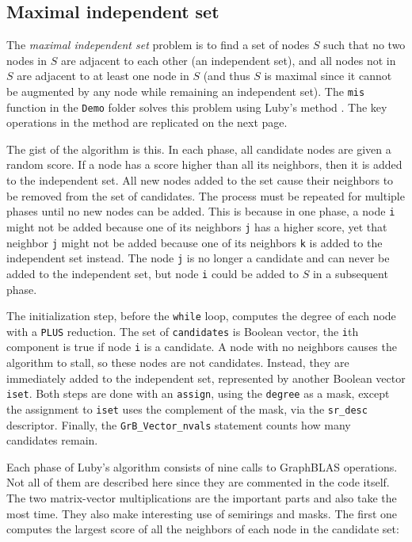 \documentclass[12pt]{article}
\begin{document}
\newpage
\subsection{Maximal independent set}
\label{mis}

The {\em maximal independent set} problem is to find a set of nodes $S$ such
that no two nodes in $S$ are adjacent to each other (an independent set), and
all nodes not in $S$ are adjacent to at least one node in $S$ (and thus $S$ is
maximal since it cannot be augmented by any node while remaining an independent
set).  The \verb'mis' function in the \verb'Demo' folder solves this problem
using Luby's method \cite{Luby86}.  The key operations in the method are
replicated on the next page.

The gist of the algorithm is this.  In each phase, all candidate nodes are
given a random score.  If a node has a score higher than all its neighbors,
then it is added to the independent set.  All new nodes added to the set cause
their neighbors to be removed from the set of candidates.  The process must be
repeated for multiple phases until no new nodes can be added.  This is because
in one phase, a node \verb'i' might not be added because one of its neighbors
\verb'j' has a higher score, yet that neighbor \verb'j' might not be added
because one of its neighbors \verb'k' is added to the independent set instead.
The node \verb'j' is no longer a candidate and can never be added to the
independent set, but node \verb'i' could be added to $S$ in a subsequent phase.

The initialization step, before the \verb'while' loop, computes the degree of
each node with a \verb'PLUS' reduction.  The set of \verb'candidates' is
Boolean vector, the \verb'i'th component is true if node \verb'i' is a
candidate.  A node with no neighbors causes the algorithm to stall, so these
nodes are not candidates.  Instead, they are immediately added to the
independent set, represented by another Boolean vector \verb'iset'.  Both steps
are done with an \verb'assign', using the \verb'degree' as a mask, except the
assignment to \verb'iset' uses the complement of the mask, via the
\verb'sr_desc' descriptor.  Finally, the \verb'GrB_Vector_nvals' statement
counts how many candidates remain.

Each phase of Luby's algorithm consists of nine calls to GraphBLAS operations.
Not all of them are described here since they are commented in the code itself.
The two matrix-vector multiplications are the important parts and also take the
most time.  They also make interesting use of semirings and masks.  The first
one computes the largest score of all the neighbors of each node in the
candidate set:
\end{document}
